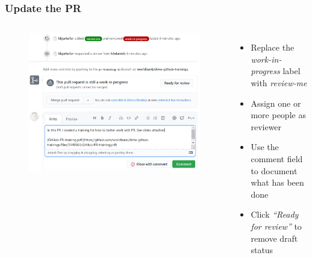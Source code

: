\documentclass[aspectratio=169]{beamer} %
\begin{document}
\begin{frame}
	\frametitle{Update the PR}
	\begin{columns}[c]
	
	\vspace{-.75cm}
	\begin{figure}
		\centering
		\includegraphics[width=\textwidth]{./img/undraft-pr.png}
	\end{figure}	
	
	\begin{itemize}
		\setlength\itemsep{1em}
		\item Replace the \textit{work-in-progress} label with \textit{review-me}
		\item Assign one or more people as reviewer
		\item Use the comment field to document what has been done
		\item Click \textit{``Ready for review''} to remove draft status 
	\end{itemize}
	
\end{columns}
\end{frame}
\end{document}
